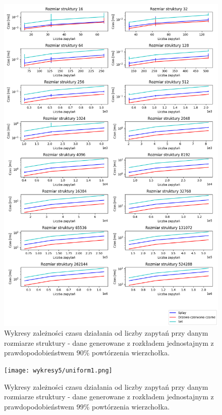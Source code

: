 \documentclass[declaration,shortabstract]{iithesis}
\theoremstyle{thm}
\theoremstyle{remark}
\theoremstyle{plain}
\theoremstyle{plain}
\theoremstyle{plain}
\begin{document}
\begin{figure}[H]  
\centering
    \includegraphics[scale=0.45]{wykresy3/uniform10.png}
      \caption{Wykresy zależności czasu działania od liczby zapytań przy danym rozmiarze struktury - dane generowane z rozkładem jednostajnym z prawdopodobieństwem  \(90\%\) powtórzenia wierzchołka. }  
\end{figure}

\begin{figure}[H]  
\centering
    \texttt{[image: wykresy5/uniform1.png]}
      \caption{Wykresy zależności czasu działania od liczby zapytań przy danym rozmiarze struktury - dane generowane z rozkładem jednostajnym z prawdopodobieństwem  \(99\%\) powtórzenia wierzchołka. }  
\end{figure}
\end{document}
